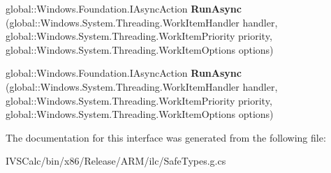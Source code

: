 \begin{DoxyCompactItemize}
global\+::\+Windows.\+Foundation.\+I\+Async\+Action {\bfseries Run\+Async} (global\+::\+Windows.\+System.\+Threading.\+Work\+Item\+Handler handler, global\+::\+Windows.\+System.\+Threading.\+Work\+Item\+Priority priority, global\+::\+Windows.\+System.\+Threading.\+Work\+Item\+Options options)
\item 
\mbox{\label{interface_windows_1_1_system_1_1_threading_1_1_i_thread_pool_statics_a1bc85955e9e8d602de11e40d41580e6b}} 
global\+::\+Windows.\+Foundation.\+I\+Async\+Action {\bfseries Run\+Async} (global\+::\+Windows.\+System.\+Threading.\+Work\+Item\+Handler handler, global\+::\+Windows.\+System.\+Threading.\+Work\+Item\+Priority priority, global\+::\+Windows.\+System.\+Threading.\+Work\+Item\+Options options)
\end{DoxyCompactItemize}


The documentation for this interface was generated from the following file\+:\begin{DoxyCompactItemize}
\item 
I\+V\+S\+Calc/bin/x86/\+Release/\+A\+R\+M/ilc/Safe\+Types.\+g.\+cs\end{DoxyCompactItemize}
